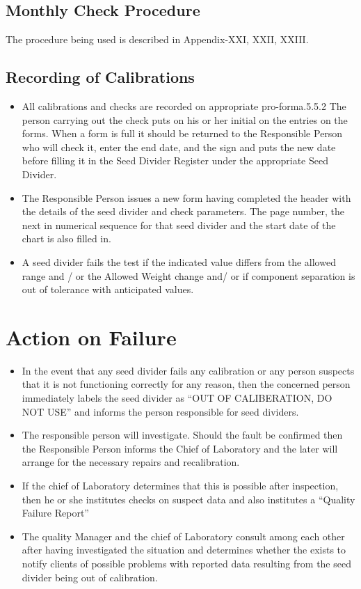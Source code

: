 \documentclass[]{book}
\providecommand{\tightlist}{%
  \setlength{\itemsep}{0pt}\setlength{\parskip}{0pt}}
\begin{document}
\subsection{Monthly Check Procedure}\label{monthly-check-procedure}

The procedure being used is described in Appendix-XXI, XXII, XXIII.

\subsection{Recording of Calibrations}\label{recording-of-calibrations}

\begin{itemize}
\tightlist
\item
  All calibrations and checks are recorded on appropriate
  pro-forma.5.5.2 The person carrying out the check puts on his or her
  initial on the entries on the forms. When a form is full it should be
  returned to the Responsible Person who will check it, enter the end
  date, and the sign and puts the new date before filling it in the Seed
  Divider Register under the appropriate Seed Divider.
\item
  The Responsible Person issues a new form having completed the header
  with the details of the seed divider and check parameters. The page
  number, the next in numerical sequence for that seed divider and the
  start date of the chart is also filled in.
\item
  A seed divider fails the test if the indicated value differs from the
  allowed range and / or the Allowed Weight change and/ or if component
  separation is out of tolerance with anticipated values.
\end{itemize}

\section{Action on Failure}\label{action-on-failure}

\begin{itemize}
\tightlist
\item
  In the event that any seed divider fails any calibration or any person
  suspects that it is not functioning correctly for any reason, then the
  concerned person immediately labels the seed divider as ``OUT OF
  CALIBERATION, DO NOT USE'' and informs the person responsible for seed
  dividers.
\item
  The responsible person will investigate. Should the fault be confirmed
  then the Responsible Person informs the Chief of Laboratory and the
  later will arrange for the necessary repairs and recalibration.
\item
  If the chief of Laboratory determines that this is possible after
  inspection, then he or she institutes checks on suspect data and also
  institutes a ``Quality Failure Report''
\item
  The quality Manager and the chief of Laboratory consult among each
  other after having investigated the situation and determines whether
  the exists to notify clients of possible problems with reported data
  resulting from the seed divider being out of calibration.
\end{itemize}
\end{document}
